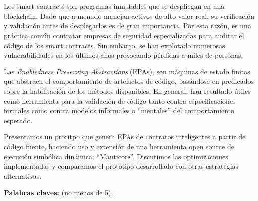 \chapter*{\runtitulo}

\noindent Los smart contracts son programas inmutables que se despliegan en una blockchain.
Dado que a menudo manejan activos de alto valor real, su verificación y validación antes de desplegarlos es de gran importancia.
Por esta razón, es una práctica común contratar empresas de seguridad especializadas para auditar el código de los smart contracts.
Sin embargo, se han explotado numerosas vulnerabilidades en los últimos años provocando pérdidas a miles de personas.

Las \textit{Enabledness Preserving Abstractions} (EPAs), son máquinas de estado finitas que abstraen el comportamiento de artefactos de código, basándose en predicados sobre la habilitación de los métodos disponibles.
En general, han resultado útiles como herramienta para la validación de código tanto contra especificaciones formales como contra modelos informales o ``mentales'' del comportamiento esperado.

Presentamos un protitpo que genera EPAs de contratos inteligentes a partir de código fuente, haciendo uso y extensión de una herramienta open source de ejecución simbólica dinámica: ``Manticore''.
Discutimos las optimizaciones implementadas y comparamos el prototipo desarrollado con otras estrategias alternativas.

\bigskip

\noindent\textbf{Palabras claves:}  (no menos de 5).